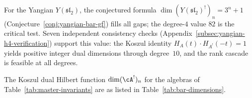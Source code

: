 For the Yangian $Y(\mathfrak{sl}_2)$, the conjectured formula
$\dim (Y(\mathfrak{sl}_2)^!)_n = 3^n + 1$ (Conjecture~\ref{conj:yangian-bar-gf})
fills all gaps; the degree-$4$ value $82$ is the critical test.
Seven independent consistency checks
(Appendix~\ref{subsec:yangian-h4-verification}) support this value:
the Koszul identity $H_A(t) \cdot H_{A^!}(-t) = 1$ yields positive
integer dual dimensions through degree~$10$, and the rank cascade is
feasible at all degrees.

\begin{proposition}
\label{prop:bar-dimensions}
The Koszul dual Hilbert function $\dim (\cA^!)_n$ for the algebras of
Table~\textup{\ref{tab:master-invariants}} are as listed in
Table~\textup{\ref{tab:bar-dimensions}}.
\end{proposition}

